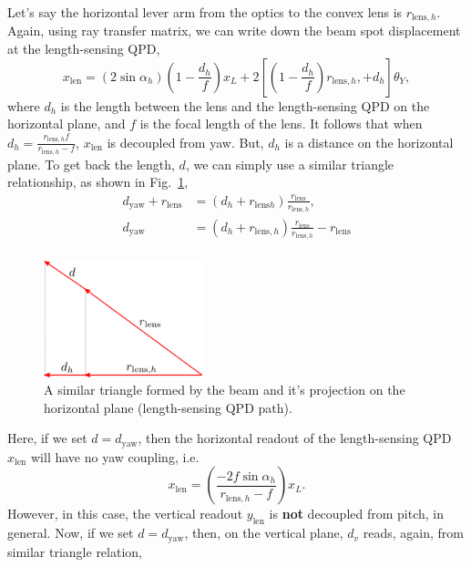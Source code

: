 Let's say the horizontal lever arm from the optics to the convex lens is $r_{\mathrm{lens},h}$.
Again, using ray transfer matrix, we can write down the  beam spot displacement at the length-sensing QPD,
\begin{equation}
	x_\mathrm{len} = \left(2\sin\alpha_h\right)\left(1-\frac{d_h}{f}\right)x_L + 2\left[\left(1-\frac{d_h}{f}\right)r_{\mathrm{lens},h},+d_h\right]\theta_Y,
	\label{eqn:x_len}
\end{equation}
where $d_h$ is the length between the lens and the length-sensing QPD on the horizontal plane, and $f$ is the focal length of the lens.
It follows that when $d_h=\frac{r_{\mathrm{lens},h}f}{r_{\mathrm{lens},h}-f}$, $x_\mathrm{len}$ is decoupled from yaw.
But, $d_h$ is a distance on the horizontal plane.
To get back the length, $d$, we can simply use a similar triangle relationship, as shown in Fig.~\ref{fig:dh},
\begin{equation}
	\begin{split}
	d_\mathrm{yaw} + r_\mathrm{lens} &= \left(d_h+r_{\mathrm{lens} h}\right)\frac{r_\mathrm{lens}}{r_{\mathrm{lens},h}},\\
	d_\mathrm{yaw} &= \left(d_h+r_{\mathrm{lens}, h}\right)\frac{r_\mathrm{lens}}{r_{\mathrm{lens},h}} - r_\mathrm{lens}\\
	\end{split}
\end{equation}
\begin{figure}[!h]
	\centering
	\includegraphics[width=46mm]{figures/d_h}
	\caption{A similar triangle formed by the beam and it's projection on the horizontal plane (length-sensing QPD path).}
	\label{fig:dh}
\end{figure}
Here, if we set $d=d_\mathrm{yaw}$, then the horizontal readout of the length-sensing QPD $x_\mathrm{len}$ will have no yaw coupling, i.e.
\begin{equation}
	x_\mathrm{len} = \left(\frac{-2f\sin\alpha_h}{r_{\mathrm{lens},h}-f}\right)x_L.
\end{equation}
However, in this case, the vertical readout $y_\mathrm{len}$ is \textbf{not} decoupled from pitch, in general.
Now, if we set $d=d_\mathrm{yaw}$, then, on the vertical plane, $d_v$ reads, again, from similar triangle relation,
